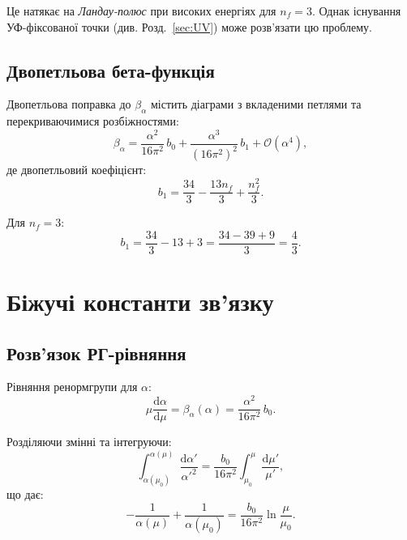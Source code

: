 \documentclass[11pt,a4paper]{article}
\numberwithin{equation}{section}
\theoremstyle{plain}
\theoremstyle{definition}
\theoremstyle{remark}
\newcommand{\dd}{\mathrm{d}}
\begin{document}
Це натякає на \emph{Ландау-полюс} при високих енергіях для $n_f=3$. Однак існування УФ-фіксованої точки (див. Розд.~\ref{sec:UV}) може розв'язати цю проблему.

\subsection{Двопетльова бета-функція}

Двопетльова поправка до $\beta_\alpha$ містить діаграми з вкладеними петлями та перекриваючимися розбіжностями:
\begin{equation}
\beta_\alpha = \frac{\alpha^2}{16\pi^2}\,b_0 + \frac{\alpha^3}{(16\pi^2)^2}\,b_1 + \mathcal{O}(\alpha^4),
\label{eq:beta-alpha-2loop}
\end{equation}
де двопетльовий коефіцієнт:
\begin{equation}
b_1 = \frac{34}{3} - \frac{13n_f}{3} + \frac{n_f^2}{3}.
\label{eq:b1}
\end{equation}

Для $n_f=3$:
\begin{equation}
b_1 = \frac{34}{3} - 13 + 3 = \frac{34-39+9}{3} = \frac{4}{3}.
\label{eq:b1-nf3}
\end{equation}

\vspace{1em}

\section{Біжучі константи зв'язку}\label{sec:running}

\subsection{Розв'язок РГ-рівняння}

Рівняння ренормгрупи для $\alpha$:
\begin{equation}
\mu\frac{\dd\alpha}{\dd\mu} = \beta_\alpha(\alpha) = \frac{\alpha^2}{16\pi^2}\,b_0.
\label{eq:RG-alpha}
\end{equation}

Розділяючи змінні та інтегруючи:
\begin{equation}
\int_{\alpha(\mu_0)}^{\alpha(\mu)} \frac{\dd\alpha'}{\alpha'^2} = \frac{b_0}{16\pi^2}\int_{\mu_0}^\mu \frac{\dd\mu'}{\mu'},
\label{eq:RG-integral}
\end{equation}
що дає:
\begin{equation}
-\frac{1}{\alpha(\mu)} + \frac{1}{\alpha(\mu_0)} = \frac{b_0}{16\pi^2}\ln\frac{\mu}{\mu_0}.
\label{eq:RG-solved}
\end{equation}
\end{document}
